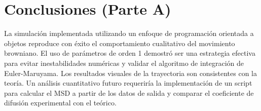 \documentclass[11pt,a4paper]{article}
\begin{document}
\section{Conclusiones (Parte A)}
La simulación implementada utilizando un enfoque de programación orientada a objetos reproduce con éxito el comportamiento cualitativo del movimiento browniano. El uso de parámetros de orden 1 demostró ser una estrategia efectiva para evitar inestabilidades numéricas y validar el algoritmo de integración de Euler-Maruyama. Los resultados visuales de la trayectoria son consistentes con la teoría. Un análisis cuantitativo futuro requeriría la implementación de un script para calcular el MSD a partir de los datos de salida y comparar el coeficiente de difusión experimental con el teórico.
\end{document}
